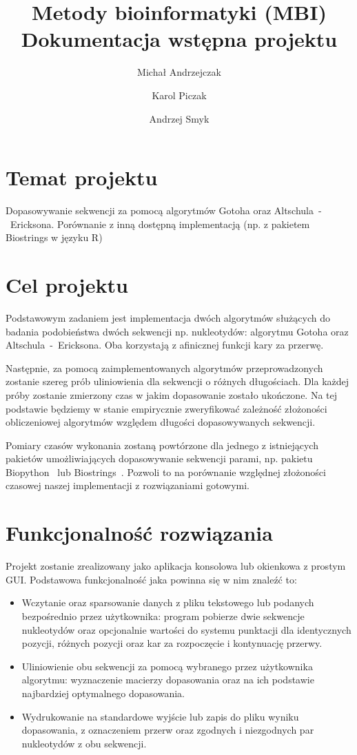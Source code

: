 \documentclass[a4paper,10pt]{article}
\title{Metody bioinformatyki (MBI)\\Dokumentacja wstępna projektu}
\author{Michał Andrzejczak\and Karol Piczak\and	Andrzej Smyk}
\begin{document}
	\maketitle
	\section{Temat projektu}

	Dopasowywanie sekwencji za pomocą algorytmów Gotoha oraz \linebreak\mbox{Altschula - Ericksona}. Porównanie z inną dostępną implementacją (np. z pakietem Biostrings w języku R)

	\section{Cel projektu}

	Podstawowym zadaniem jest implementacja dwóch algorytmów służących do badania podobieństwa dwóch sekwencji np. nukleotydów: algorytmu Gotoha oraz \mbox{Altschula - Ericksona}. Oba korzystają z afinicznej funkcji kary za przerwę. 

	Następnie, za pomocą zaimplementowanych algorytmów przeprowadzonych zostanie szereg prób uliniowienia dla sekwencji o różnych długościach. Dla każdej próby zostanie zmierzony czas w jakim dopasowanie zostało ukończone. Na tej podstawie będziemy w stanie empirycznie zweryfikować zależność złożoności obliczeniowej algorytmów względem długości dopasowywanych sekwencji. 

	Pomiary czasów wykonania zostaną powtórzone dla jednego z istniejących pakietów umożliwiających dopasowywanie sekwencji parami, np. pakietu Biopython~\cite{biopython} lub Biostrings~\cite{biostrings}. Pozwoli to na porównanie względnej złożoności czasowej naszej implementacji z rozwiązaniami gotowymi. 

	\section{Funkcjonalność rozwiązania}

	Projekt zostanie zrealizowany jako aplikacja konsolowa lub okienkowa z prostym GUI. Podstawowa funkcjonalność jaka powinna się w nim znaleźć to:
	\begin{itemize}
		\item Wczytanie oraz sparsowanie danych z pliku tekstowego lub podanych bezpośrednio przez użytkownika: program pobierze dwie sekwencje nukleotydów oraz opcjonalnie wartości do systemu punktacji dla identycznych pozycji, różnych pozycji oraz kar za rozpoczęcie i kontynuację przerwy.
		\item Uliniowienie obu sekwencji za pomocą wybranego przez użytkownika algorytmu: wyznaczenie macierzy dopasowania oraz na ich podstawie najbardziej optymalnego dopasowania. 
		\item Wydrukowanie na standardowe wyjście lub zapis do pliku wyniku dopasowania, z oznaczeniem przerw oraz zgodnych i niezgodnych par nukleotydów z obu sekwencji.
	\end{itemize}
\end{document}
